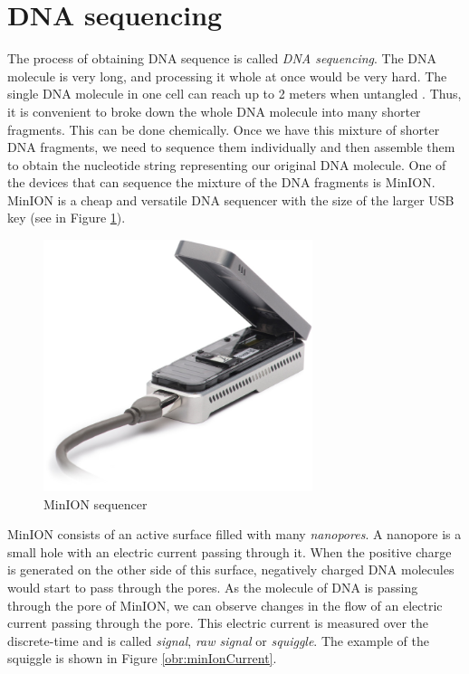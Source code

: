 \section{DNA sequencing}
\label{section:dnaSequencing}

The process of obtaining DNA sequence is called \textit{DNA sequencing}.
The DNA molecule is very long, and processing it whole at once would be very hard.
The single DNA molecule in one cell can reach up to 2 meters when untangled \cite{dnaLength:2020}.
Thus, it is convenient to broke down the whole DNA molecule into many shorter fragments.
This can be done chemically. Once we have this mixture of shorter DNA fragments, we need to sequence them
individually and then assemble them to obtain the nucleotide string representing
our original DNA molecule. One of the devices that can sequence the mixture of the
DNA fragments is MinION\cite{lu2016oxford}. MinION is a cheap and versatile DNA sequencer
with the size of the larger USB key (see in Figure \ref{obr:minIon}).

\begin{figure}
\centerline{\includegraphics[width=0.7\textwidth, height=0.3\textheight]{images/minion}}
\caption[MinION]{MinION sequencer\cite{MinION:2020}}
\label{obr:minIon}
\end{figure}

MinION consists of an active surface filled with many \textit{nanopores}. A nanopore
is a small hole with an electric current passing through it. When the positive charge
is generated on the other side of this surface, negatively charged DNA molecules
would start to pass through the pores. As the molecule of DNA is passing through the pore of
MinION, we can observe changes in the flow of an electric current passing through the pore.
This electric current is measured over the discrete-time and is called \textit{signal},
\textit{raw signal} or \textit{squiggle}. The example of the squiggle is shown in Figure \ref{obr:minIonCurrent}.

